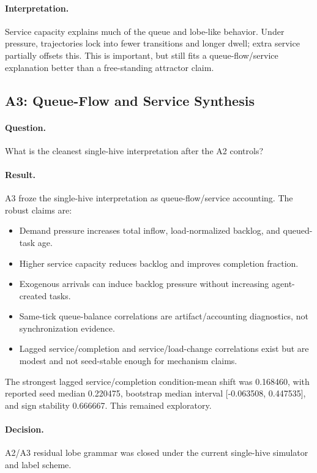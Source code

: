 \documentclass[11pt]{article}
\begin{document}
\paragraph{Interpretation.}
Service capacity explains much of the queue and lobe-like behavior. Under
pressure, trajectories lock into fewer transitions and longer dwell; extra
service partially offsets this. This is important, but still fits a
queue-flow/service explanation better than a free-standing attractor claim.

\subsection{A3: Queue-Flow and Service Synthesis}

\paragraph{Question.}
What is the cleanest single-hive interpretation after the A2 controls?

\paragraph{Result.}
A3 froze the single-hive interpretation as queue-flow/service accounting. The
robust claims are:

\begin{itemize}
\item Demand pressure increases total inflow, load-normalized backlog, and
queued-task age.
\item Higher service capacity reduces backlog and improves completion fraction.
\item Exogenous arrivals can induce backlog pressure without increasing
agent-created tasks.
\item Same-tick queue-balance correlations are artifact/accounting diagnostics,
not synchronization evidence.
\item Lagged service/completion and service/load-change correlations exist but
are modest and not seed-stable enough for mechanism claims.
\end{itemize}

The strongest lagged service/completion condition-mean shift was 0.168460, with
reported seed median 0.220475, bootstrap median interval [-0.063508, 0.447535],
and sign stability 0.666667. This remained exploratory.

\paragraph{Decision.}
A2/A3 residual lobe grammar was closed under the current single-hive simulator
and label scheme.
\end{document}
